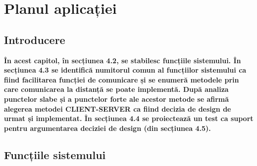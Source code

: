 \chapter{Planul aplicației}
\section{Introducere}
\par \textbf{În acest capitol, în secțiunea 4.2, se stabilesc funcțiile sistemului. În secțiunea 4.3 se identifică numitorul comun al funcțiilor sistemului ca fiind facilitarea funcției de \textsf{comunicare} și se  enumeră metodele prin care comunicarea la distanță se poate implementă. După analiza punctelor slabe și a punctelor forte ale acestor metode se afirmă alegerea metodei \textsf{CLIENT-SERVER} ca fiind decizia de design de urmat și implementat. În secțiunea 4.4 se proiectează un test ca suport pentru argumentarea deciziei de design (din secțiunea 4.5).}

\section{Funcțiile sistemului}

